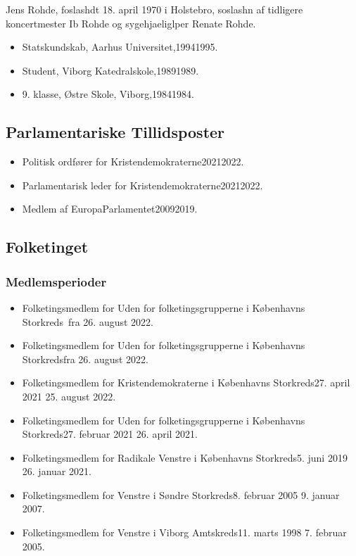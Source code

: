 \documentclass[11pt, a4paper]{awesome-cv}
\begin{document}
\makecvheader[R]
\makelettertitle
\begin{cvletter}
Jens Rohde, foslashdt 18. april 1970 i Holstebro, soslashn af tidligere koncertmester Ib Rohde og sygehjaeliglper Renate Rohde.

\begin{itemize}
\item Statskundskab, Aarhus Universitet,19941995.
\item Student, Viborg Katedralskole,19891989.
\item 9. klasse, Østre Skole, Viborg,19841984.
\end{itemize}
\subsection*{Parlamentariske Tillidsposter}
\begin{itemize}
\item Politisk ordfører for Kristendemokraterne20212022.
\item Parlamentarisk leder for Kristendemokraterne20212022.
\item Medlem af EuropaParlamentet20092019.
\end{itemize}
\subsection*{Folketinget}
\subsubsection*{Medlemsperioder}
\begin{itemize}
\item Folketingsmedlem for Uden for folketingsgrupperne i Københavns Storkreds fra 26. august 2022.
\item Folketingsmedlem for Uden for folketingsgrupperne i Københavns Storkredsfra 26. august 2022.
\item Folketingsmedlem for Kristendemokraterne i Københavns Storkreds27. april 2021  25. august 2022.
\item Folketingsmedlem for Uden for folketingsgrupperne i Københavns Storkreds27. februar 2021  26. april 2021.
\item Folketingsmedlem for Radikale Venstre i Københavns Storkreds5. juni 2019  26. januar 2021.
\item Folketingsmedlem for Venstre i Søndre Storkreds8. februar 2005  9. januar 2007.
\item Folketingsmedlem for Venstre i Viborg Amtskreds11. marts 1998  7. februar 2005.
\end{itemize}

\end{cvletter}
\end{document}
